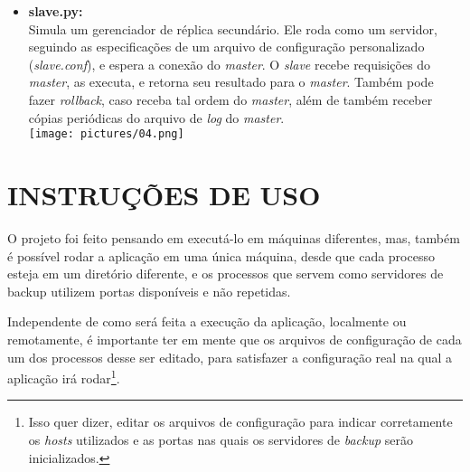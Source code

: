 \documentclass[12pt,a4paper]{article}
\begin{document}
\begin{itemize}
			\item \textbf{slave.py:}\\Simula um gerenciador de réplica secundário. Ele roda como um servidor, seguindo as especificações de um arquivo de configuração personalizado (\textit{slave.conf}), e espera a conexão do \textit{master}. O \textit{slave} recebe requisições do \textit{master}, as executa, e retorna seu resultado para o \textit{master}. Também pode fazer \textit{rollback}, caso receba tal ordem do \textit{master}, além de também receber cópias periódicas do arquivo de \textit{log} do \textit{master}.\\
				\texttt{[image: pictures/04.png]}
		\end{itemize}
	
	\section{\normalsize INSTRUÇÕES DE USO}
		O projeto foi feito pensando em executá-lo em máquinas diferentes, mas, também é possível rodar a aplicação em uma única máquina, desde que cada processo esteja em um diretório diferente, e os processos que servem como servidores de backup utilizem portas disponíveis e não repetidas.
		
		Independente de como será feita a execução da aplicação, localmente ou remotamente, é importante ter em mente que os arquivos de configuração de cada um dos processos desse ser editado, para satisfazer a configuração real na qual a aplicação irá rodar\footnote{Isso quer dizer, editar os arquivos de configuração para indicar corretamente os \textit{hosts} utilizados e as portas nas quais os servidores de \textit{backup} serão inicializados.}.
	
\end{document}
